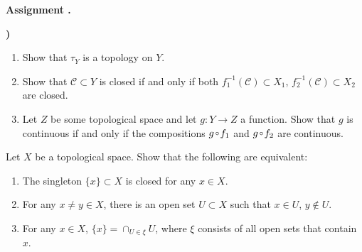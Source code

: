 \documentclass[12pt,reqno]{amsart}
\newcounter{assign}
\newenvironment{assignment}{\par\noindent\textbf{Assignment \Roman{assign}.\hskip2pt}}{\par\vskip12pt\stepcounter{assign}}
\theoremstyle{plain}
\theoremstyle{definition}
\newcommand{\comp}{\mkern-1mu\raise 1pt\hbox{$\,\scriptstyle\circ\,$}\mkern-1mu}
\begin{document}
\begin{assignment}
\begin{list}{\textbf{)}}{\setlength{\itemsep}{2pt}\setlength{\leftmargin}{15pt}\setlength{\parsep}{0pt}}
\begin{enumerate}[label=\textbf{\alph*})]
\item Show that $\tau_Y$ is a topology on $Y$.
\item Show that $\mathcal C\subset Y$ is closed if and only if both $f_1^{-1}(\mathcal C)\subset X_1$, $f_2^{-1}(\mathcal C)\subset X_2$ are closed.
\item Let $Z$ be some topological space and let $g\colon Y\to Z$ a function. Show that $g$ is continuous if and only if the compositions $g\comp f_1$ and $g\comp f_2$ are continuous.
\end{enumerate}
\item Let $X$ be a topological space. Show that the following are equivalent:
\begin{enumerate}[label=(\roman*)]
\item The singleton $\{x\}\subset X$ is closed for any $x\in X$.
\item For any $x\neq y\in X$, there is an open set $U\subset X$ such that $x\in U$, $y\notin U$.
\item For any $x\in X$, $\{x\}=\cap_{U\in\xi} U$, where $\xi$ consists of all open sets that contain $x$.
\end{enumerate}
\end{list}
\end{assignment}
\end{document}
